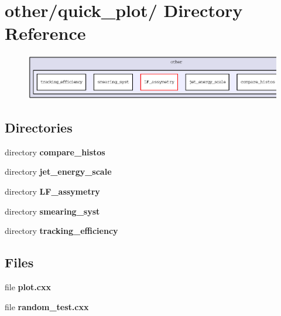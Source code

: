 \section{other/quick\_\-plot/ Directory Reference}
\label{dir_7e089ee6e63f13067b8efeff98c91b1f}


\begin{figure}[H]
\begin{center}
\leavevmode
\includegraphics[width=355pt]{dir_7e089ee6e63f13067b8efeff98c91b1f_dep}
\end{center}
\end{figure}
\subsection*{Directories}
\begin{CompactItemize}
\item 
directory \bf{compare\_\-histos}
\item 
directory \bf{jet\_\-energy\_\-scale}
\item 
directory \bf{LF\_\-assymetry}
\item 
directory \bf{smearing\_\-syst}
\item 
directory \bf{tracking\_\-efficiency}
\end{CompactItemize}
\subsection*{Files}
\begin{CompactItemize}
\item 
file \textbf{plot.cxx}
\item 
file \textbf{random\_\-test.cxx}
\end{CompactItemize}
